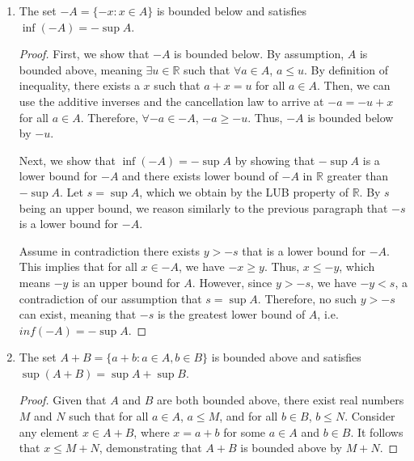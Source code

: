 \documentclass[10pt]{article}
\newcommand{\N}{\mathbb{N}}
\newcommand{\R}{\mathbb{R}}
\newenvironment{problem}[2][Problem]{\begin{trivlist}
\item[\hskip \labelsep {\bfseries #1}\hskip \labelsep {\bfseries #2.}]}{\end{trivlist}}
\begin{document}
\begin{problem}{3}
\begin{enumerate}
\begin{proof}
                \textbf{Example where equality does not hold:}
                Let $A = \{ \frac{n-1}{n} : n \in \N \}$ and $B = \{ \frac{n-1}{2n} : n \in \N \}$. Then, $A \cap B = \{0\}$. We have $\sup A = 1$ and $\sup B = 1/2$. Then, $\sup(A \cap B) = 0 < 1/2 = \min(\sup A, \sup B)$.
            \end{proof}
		\item The set $ -A=\{ -x: x \in A \} $ is bounded below and satisfies $ \inf(-A)=-\sup A $.
            \begin{proof}
                First, we show that $-A$ is bounded below. By assumption, $A$ is bounded above, meaning $\exists u \in \R$ such that $\forall a \in A$, $a \leq u$.
                By definition of inequality, there exists a $x$ such that $a + x = u$ for all $a \in A$.
                Then, we can use the additive inverses and the cancellation law to arrive at $-a = -u + x$ for all $a \in A$. Therefore, $\forall -a \in -A$, $-a \geq -u$. Thus, $-A$ is bounded below by $-u$.
                
                Next, we show that $\inf(-A) = -\sup A$ by showing that $-\sup A$ is a lower bound for $-A$ and there exists lower bound of $-A$ in $\R$ greater than $-\sup A$.
                Let $s = \sup A$, which we obtain by the LUB property of $\R$. By $s$ being an upper bound, we reason similarly to the previous paragraph that $-s$ is a lower bound for $-A$.

                Assume in contradiction there exists $y> -s$ that is a lower bound for $-A$. This implies that for all $x \in -A$, we have $-x\geq y$. Thus, $x \leq -y$, which means $-y$ is an upper bound for $A$. However, since $y>-s$, we have $-y<s$, a contradiction of our assumption that $s = \sup A$. Therefore, no such $y > -s$ can exist, meaning that $-s$ is the greatest lower bound of $A$, i.e. $inf(-A) = -\sup A$. 
            \end{proof}
            \item The set $ A+B=\{a+b: a \in A, b \in B \} $ is bounded above and satisfies $ \sup(A+B)=\sup A + \sup B $.
                \begin{proof}
                    Given that $A$ and $B$ are both bounded above, there exist real numbers $M$ and $N$ such that for all $a \in A$, $a \leq M$, and for all $b \in B$, $b \leq N$. Consider any element $x \in A+B$, where $x = a + b$ for some $a \in A$ and $b \in B$. It follows that $x \leq M + N$, demonstrating that $A+B$ is bounded above by $M + N$.


\end{proof}
\end{enumerate}
\end{problem}
\end{document}
